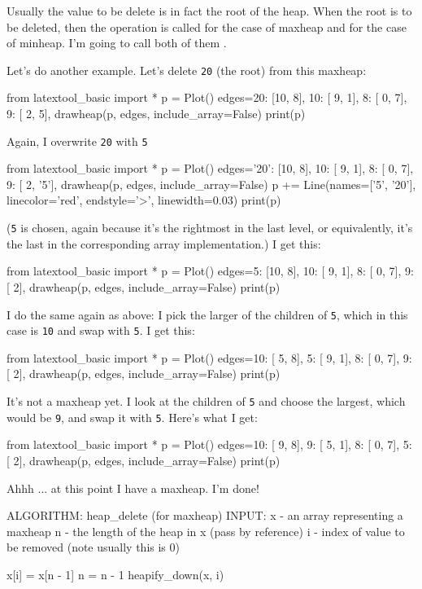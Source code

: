 Usually the value to be delete is in fact the root of the heap.
When the root is to be deleted, then the operation is called
 for the case of maxheap
and  for the case of
minheap.
I'm going to call both of them .

Let's do another example.
Let's delete \texttt{20} (the root) from this maxheap:


from latextool_basic import *
p = Plot()
edges={20: [10, 8],
10: [ 9, 1],
8: [ 0, 7],
9: [ 2, 5],
}
drawheap(p, edges, include_array=False)
print(p)


Again, I overwrite \texttt{20} with \texttt{5}


from latextool_basic import *
p = Plot()
edges={'20': [10, 8],
10: [ 9, 1],
8: [ 0, 7],
9: [ 2, '5'],
}
drawheap(p, edges, include_array=False)
p += Line(names=['5', '20'], linecolor='red', endstyle='>', linewidth=0.03)      
print(p)

(\texttt{5} is chosen, again because it's the rightmost
in the last level, or equivalently, it's the last in the
corresponding array implementation.)
I get this:


from latextool_basic import *
p = Plot()
edges={5: [10, 8],
10: [ 9, 1],
8: [ 0, 7],
9: [ 2],
}
drawheap(p, edges, include_array=False)
print(p)

I do the same again as above: I pick the larger of the children
of \texttt{5}, which in this case is \texttt{10} and swap with \texttt{5}.
I get this:


from latextool_basic import *
p = Plot()
edges={10: [ 5, 8],
5: [ 9, 1],
8: [ 0, 7],
9: [ 2],
}
drawheap(p, edges, include_array=False)
print(p)

It's not a maxheap yet.
I look at the children of \texttt{5} and choose the largest,
which would be \texttt{9}, and swap it with \texttt{5}.
Here's what I get:


from latextool_basic import *
p = Plot()
edges={10: [ 9, 8],
9: [ 5, 1],
8: [ 0, 7],
5: [ 2],
}
drawheap(p, edges, include_array=False)
print(p)

Ahhh ... at this point I have a maxheap.
I'm done!

\begin{console}[commandchars=\\\{\}]
  ALGORITHM: heap_delete (for maxheap)
  INPUT: x - an array representing a maxheap
  n - the length of the heap in x (pass by reference)
  i - index of value to be removed (note usually
  this is 0)

  x[i] = x[n - 1]
  n = n - 1
  heapify_down(x, i)
\end{console}

